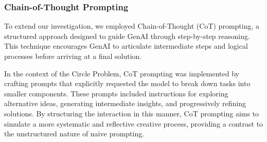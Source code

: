 \subsubsection{Chain-of-Thought Prompting}

To extend our investigation, we employed Chain-of-Thought (CoT) prompting, a structured approach designed to guide GenAI through step-by-step reasoning. This technique encourages GenAI to articulate intermediate steps and logical processes before arriving at a final solution.

In the context of the Circle Problem, CoT prompting was implemented by crafting prompts that explicitly requested the model to break down tasks into smaller components. These prompts included instructions for exploring alternative ideas, generating intermediate insights, and progressively refining solutions. By structuring the interaction in this manner, CoT prompting aims to simulate a more systematic and reflective creative process, providing a contrast to the unstructured nature of naive prompting.

